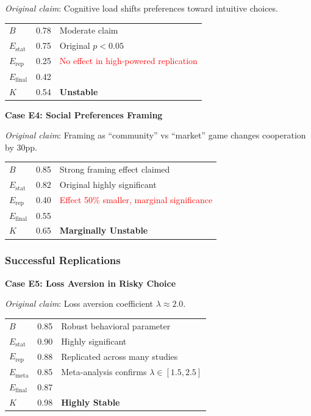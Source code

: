 \documentclass[11pt,a4paper]{article}
\begin{document}
\textit{Original claim}: Cognitive load shifts preferences toward intuitive choices.

\begin{center}
\begin{tabular}{lcl}
\toprule
$B$ & 0.78 & Moderate claim \\
$E_{\text{stat}}$ & 0.75 & Original $p < 0.05$ \\
$E_{\text{rep}}$ & 0.25 & \textcolor{red}{No effect in high-powered replication} \\
\midrule
$E_{\text{final}}$ & 0.42 & \\
$K$ & 0.54 & \textbf{Unstable} \\
\bottomrule
\end{tabular}
\end{center}

\textbf{Case E4: Social Preferences Framing}

\textit{Original claim}: Framing as ``community'' vs ``market'' game changes cooperation by 30pp.

\begin{center}
\begin{tabular}{lcl}
\toprule
$B$ & 0.85 & Strong framing effect claimed \\
$E_{\text{stat}}$ & 0.82 & Original highly significant \\
$E_{\text{rep}}$ & 0.40 & \textcolor{red}{Effect 50\% smaller, marginal significance} \\
\midrule
$E_{\text{final}}$ & 0.55 & \\
$K$ & 0.65 & \textbf{Marginally Unstable} \\
\bottomrule
\end{tabular}
\end{center}

\subsubsection{Successful Replications}

\textbf{Case E5: Loss Aversion in Risky Choice}

\textit{Original claim}: Loss aversion coefficient $\lambda \approx 2.0$.

\begin{center}
\begin{tabular}{lcl}
\toprule
$B$ & 0.85 & Robust behavioral parameter \\
$E_{\text{stat}}$ & 0.90 & Highly significant \\
$E_{\text{rep}}$ & 0.88 & \textcolor{green!60!black}{Replicated across many studies} \\
$E_{\text{meta}}$ & 0.85 & Meta-analysis confirms $\lambda \in [1.5, 2.5]$ \\
\midrule
$E_{\text{final}}$ & 0.87 & \\
$K$ & 0.98 & \textbf{Highly Stable} \\
\bottomrule
\end{tabular}
\end{center}
\end{document}
